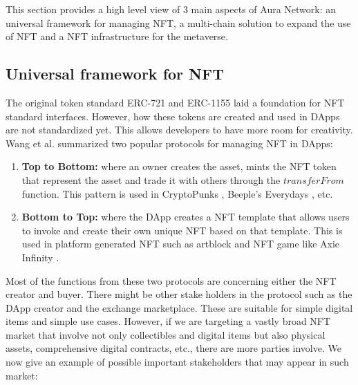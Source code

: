 \documentclass[12pt]{article}
\begin{document}
This section provides a high level view of 3 main aspects of Aura Network: an universal framework for managing NFT, a multi-chain solution to expand the use of NFT and a NFT infrastructure for the metaverse.

\subsection{Universal framework for NFT}
The original token standard ERC-721 and ERC-1155 laid a foundation for NFT standard interfaces. However, how these tokens are created and used in DApps are not standardized yet. This allows developers to have more room for creativity. Wang et al. \cite{wang2021non} summarized two popular protocols for managing NFT in DApps:
\begin{enumerate}
\item \textbf{Top to Bottom:} where an owner creates the asset, mints the NFT token that represent the asset and trade it with others through the $transferFrom$ function. This pattern is used in CryptoPunks \cite{cryptopunks}, Beeple's Everydays \cite{beeple}, etc.
\item \textbf{Bottom to Top:} where the DApp creates a NFT template that allows users to invoke and create their own unique NFT based on that template. This is used in platform generated NFT such as artblock \cite{artblock} and NFT game like Axie Infinity \cite{axie}.
\end{enumerate}

Most of the functions from these two protocols are concerning either the NFT creator and buyer. There might be other stake holders in the protocol such as the DApp creator and the exchange marketplace. These are suitable for simple digital items and simple use cases. However, if we are targeting a vastly broad NFT market that involve not only collectibles and digital items but also physical assets, comprehensive digital contracts, etc., there are more parties involve. We now give an example of possible important stakeholders that may appear in such market:
\end{document}

